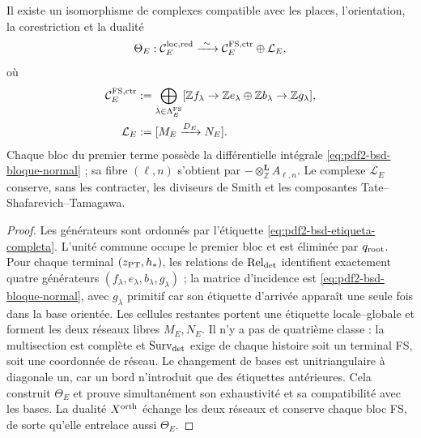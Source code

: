 \begin{theorem}
\label{thm:pdf2-bsd-descomposicion-global}
Il existe un isomorphisme de complexes compatible avec les places, l'orientation,
la corestriction et la dualité
\begin{equation}\label{eq:pdf2-bsd-descomposicion-global}
 \Theta_E:\mathcal C_E^{\rm loc,red}
 \xrightarrow{\ \sim\ }
 \mathcal C_E^{\rm FS,ctr}\oplus\mathcal L_E,
\end{equation}
où
\begin{equation}\label{eq:pdf2-bsd-sumando-fs-y-lattice}
 \begin{aligned}
 \mathcal C_E^{\rm FS,ctr}
  &:=\bigoplus_{\lambda\in\Lambda_E^{\rm FS}}
   [\mathbb Zf_\lambda\to
    \mathbb Ze_\lambda\oplus\mathbb Zb_\lambda
                    \to\mathbb Zg_\lambda],\\
 \mathcal L_E&:=[M_E\xrightarrow{D_E}N_E].
 \end{aligned}
\end{equation}
Chaque bloc du premier terme possède la différentielle intégrale
\eqref{eq:pdf2-bsd-bloque-normal} ; sa fibre $(\ell,n)$ s'obtient par
$-\otimes_{\mathbb Z}^{\mathbf L}A_{\ell,n}$. Le complexe $\mathcal L_E$
conserve, sans
les contracter, les diviseurs de Smith et les composantes
Tate--Shafarevich--Tamagawa.
\end{theorem}

\begin{proof}
Les générateurs sont ordonnés par l'étiquette
\eqref{eq:pdf2-bsd-etiqueta-completa}. L'unité commune occupe le premier
bloc et est éliminée par $q_{\rm root}$. Pour chaque terminal
$(z_{\rm PT},h_*)$, les relations de $\operatorname{Rel}_{\rm det}$
identifient exactement quatre générateurs
$(f_\lambda,e_\lambda,b_\lambda,g_\lambda)$ ; la matrice d'incidence est
\eqref{eq:pdf2-bsd-bloque-normal}, avec $g_\lambda$ primitif car son
étiquette d'arrivée apparaît une seule fois dans la base orientée. Les cellules
restantes portent une étiquette locale--globale et forment les deux réseaux libres
$M_E,N_E$. Il n'y a pas de quatrième classe : la multisection est complète et
$\operatorname{Surv}_{\rm det}$ exige de chaque histoire soit un terminal
FS, soit une coordonnée de réseau. Le changement de bases est unitriangulaire à
diagonale un, car un bord n'introduit que des étiquettes antérieures. Cela
construit $\Theta_E$ et prouve simultanément son exhaustivité et sa
compatibilité avec les bases. La dualité $X^{\rm orth}$ échange les
deux réseaux et conserve chaque bloc FS, de sorte qu'elle entrelace aussi
$\Theta_E$.
\end{proof}

